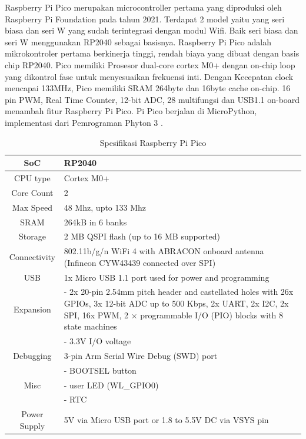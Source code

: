 Raspberry Pi Pico merupakan microcontroller pertama yang diproduksi oleh Raspberry Pi Foundation pada tahun 2021. Terdapat 2 model
yaitu yang seri biasa dan seri W yang sudah terintegrasi dengan modul Wifi. Baik seri biasa dan seri W menggunakan RP2040 sebagai basisnya.
Raspberry Pi Pico adalah mikrokontroler pertama berkinerja tinggi, rendah biaya
yang dibuat dengan basis chip RP2040. Pico memiliki
Prosesor dual-core cortex M0+ dengan on-chip
loop yang dikontrol fase untuk menyesuaikan frekuensi inti. Dengan
Kecepatan clock mencapai 133MHz, Pico memiliki SRAM 264byte dan 16byte
cache on-chip. 16 pin PWM, Real Time Counter,
12-bit ADC, 28 multifungsi
dan USB1.1 on-board menambah fitur Raspberry Pi
Pico. Pi Pico berjalan di MicroPython, implementasi dari
Pemrograman Phyton 3 \parencite{thothadri2021analysis}.
\begin{table}[h!]
	\caption{Spesifikasi Raspberry Pi Pico}
	\centering
	\begin{tabular}{|c|p{10cm}|}
		\hline
		SoC & RP2040  \\
		\hline
		CPU type & Cortex M0+  \\
		\hline
		Core Count & 2  \\
		\hline
		Max Speed & 48 Mhz, upto 133 Mhz  \\
		\hline
		SRAM & 264kB in 6 banks  \\
		\hline
		Storage & 2 MB QSPI flash (up to 16 MB supported)  \\
		\hline
		Connectivity & 802.11b/g/n WiFi 4 with ABRACON onboard antenna (Infineon CYW43439 connected over SPI)  \\
		\hline
		USB & 1x Micro USB 1.1 port used for power and programming  \\
		\hline
		Expansion & - 2x 20-pin 2.54mm pitch header and castellated holes with 26x GPIOs, 3x 12-bit ADC up to 500 Kbps, 2x UART, 2x I2C, 2x SPI, 16x PWM, 2 × programmable I/O (PIO) blocks with 8 state machines  \\
		& - 3.3V I/O voltage  \\
		\hline
		Debugging & 3-pin Arm Serial Wire Debug (SWD) port  \\
		\hline
		& - BOOTSEL button  \\
		Misc & - user LED (WL\_GPIO0)  \\
		& - RTC  \\
		\hline
		Power Supply & 5V via Micro USB port or 1.8 to 5.5V DC via VSYS pin  \\
		\hline
	\end{tabular}
\end{table}
